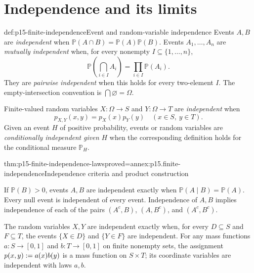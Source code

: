 \section{Independence and its limits}
\label{sec:p15-finite-independence}

\begin{hbdefinition}{def:p15-finite-independence}{Event and random-variable independence}
Events \(A,B\) are \emph{independent} when
\(\mathbb P(A\cap B)=\mathbb P(A)\mathbb P(B)\).
Events \(A_1,\ldots,A_n\) are \emph{mutually independent} when, for
every nonempty \(I\subseteq\{1,\ldots,n\}\),
\[
 \mathbb P\left(\bigcap_{i\in I}A_i\right)
       =\prod_{i\in I}\mathbb P(A_i).
\]
They are \emph{pairwise independent} when this holds for every two-element
\(I\). The empty-intersection convention is \(\bigcap\varnothing=\Omega\).

Finite-valued random variables \(X:\Omega\to S\) and
\(Y:\Omega\to T\) are \emph{independent} when
\[
 p_{X,Y}(x,y)=p_X(x)p_Y(y)\quad(x\in S,\ y\in T).
\]
Given an event \(H\) of positive probability, events or random variables
are \emph{conditionally independent given \(H\)} when the corresponding
definition holds for the conditional measure \(\mathbb P_H\).
\end{hbdefinition}

\begin{hbtheorem}{thm:p15-finite-independence-laws}{proved=annex:p15.finite-independence}{Independence criteria and product construction}
\par\nobreak
If \(\mathbb P(B)>0\), events \(A,B\) are independent exactly when
\(\mathbb P(A\mid B)=\mathbb P(A)\). Every null event is independent
of every event. Independence of \(A,B\) implies independence of each
of the pairs \((A^c,B)\), \((A,B^c)\), and \((A^c,B^c)\).

The random variables \(X,Y\) are independent exactly when, for every
\(D\subseteq S\) and \(F\subseteq T\), the events \(\{X\in D\}\)
and \(\{Y\in F\}\) are independent.
For any mass functions \(a:S\to[0,1]\) and \(b:T\to[0,1]\) on
finite nonempty sets, the assignment \(p(x,y)\mathrel{:=} a(x)b(y)\) is a mass
function on \(S\times T\); its coordinate variables are independent
with laws \(a,b\).
\end{hbtheorem}

